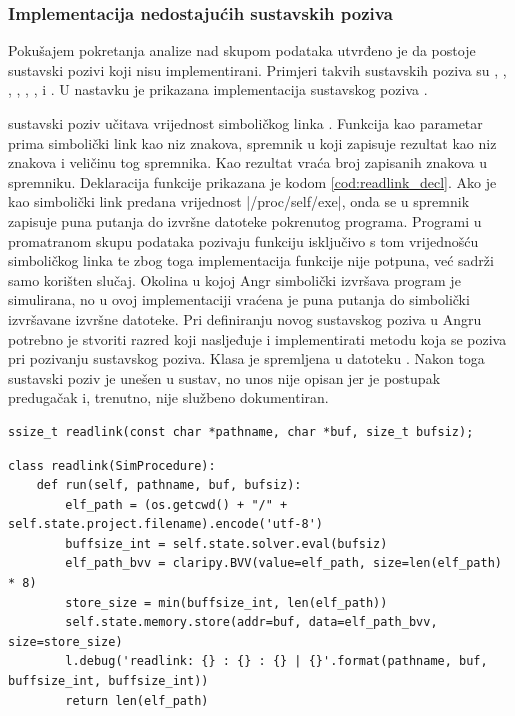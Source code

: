 \subsubsection{Implementacija nedostajućih sustavskih poziva}
Pokušajem pokretanja analize nad skupom podataka utvrđeno je da postoje
sustavski pozivi koji nisu implementirani. Primjeri takvih sustavskih poziva su
, , , 
, , ,
 i . U nastavku je
prikazana implementacija sustavskog poziva . 

sustavski poziv  učitava vrijednost simboličkog linka 
\cite{readlink_doc}. Funkcija kao parametar prima simbolički link kao niz
znakova, spremnik u koji zapisuje rezultat kao niz znakova i veličinu tog
spremnika. Kao rezultat vraća broj zapisanih znakova u spremniku. Deklaracija
 funkcije prikazana je kodom \ref{cod:readlink_decl}. Ako je kao simbolički 
 link predana vrijednost \inlinecode|/proc/self/exe|,
onda se u spremnik zapisuje puna putanja do izvršne datoteke pokrenutog 
programa. Programi u promatranom skupu podataka pozivaju funkciju isključivo
s tom vrijednošću simboličkog linka te zbog toga implementacija funkcije nije
potpuna, već sadrži samo korišten slučaj. Okolina u kojoj Angr simbolički 
izvršava program je simulirana, no u ovoj implementaciji vraćena je puna 
putanja do simbolički izvršavane izvršne datoteke. Pri definiranju novog
sustavskog poziva u Angru potrebno je stvoriti razred koji nasljeđuje
 i implementirati metodu  koja se
poziva pri pozivanju sustavskog poziva. Klasa je spremljena u datoteku
. 
Nakon toga sustavski poziv je unešen u sustav, no unos nije opisan jer je
postupak predugačak i, trenutno, nije službeno dokumentiran.

\begin{lstlisting}[caption={Deklaracija readlink funkcije},label={cod:readlink_decl}]
    ssize_t readlink(const char *pathname, char *buf, size_t bufsiz);
\end{lstlisting}

\begin{lstlisting}[caption={Implementacija readlink sustavskog poziva za angr},label={cod:readlink_impl}]
class readlink(SimProcedure):
    def run(self, pathname, buf, bufsiz):
        elf_path = (os.getcwd() + "/" + self.state.project.filename).encode('utf-8')
        buffsize_int = self.state.solver.eval(bufsiz)
        elf_path_bvv = claripy.BVV(value=elf_path, size=len(elf_path) * 8)
        store_size = min(buffsize_int, len(elf_path))
        self.state.memory.store(addr=buf, data=elf_path_bvv, size=store_size)
        l.debug('readlink: {} : {} : {} | {}'.format(pathname, buf, buffsize_int, buffsize_int))
        return len(elf_path)
\end{lstlisting}


